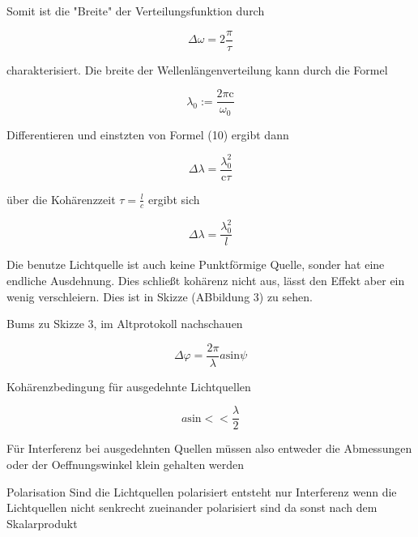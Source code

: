             Somit ist die "Breite" der Verteilungsfunktion durch 

            \begin{equation}
                \Delta \omega = 2 \frac{\pi}{\tau}
            \end{equation}

            charakterisiert. Die breite der Wellenlängenverteilung kann durch die Formel 

            \begin{equation}
                \lambda_0 := \frac{2 \pi \text{c}}{\omega_0}
            \end{equation}

            Differentieren und einstzten von Formel (10) ergibt dann 

            \begin{equation}
                \Delta \lambda = \frac{\lambda_0^2}{\text{c}\tau}
            \end{equation}

            über die Kohärenzzeit $\tau = \frac{l}{c}$ ergibt sich 

            \begin{equation}
                \Delta \lambda = \frac{\lambda_0^2}{l}
            \end{equation}

            Die benutze Lichtquelle ist auch keine Punktförmige Quelle, sonder hat eine endliche Ausdehnung. Dies schließt kohärenz nicht aus, 
            lässt den Effekt aber ein wenig verschleiern. Dies ist in Skizze (ABbildung 3) zu sehen.

        Bums zu Skizze 3, im Altprotokoll nachschauen 

            \begin{equation}
                \Delta \varphi = \frac{2 \pi}{\lambda} a \text{sin} \psi 
            \end{equation}

            Kohärenzbedingung für ausgedehnte Lichtquellen

            \begin{equation}
                a \text{sin} << \frac{\lambda}{2}
            \end{equation}

            Für Interferenz bei ausgedehnten Quellen müssen also entweder die Abmessungen oder der Oeffnungswinkel klein gehalten werden 

            Polarisation
            Sind die Lichtquellen polarisiert entsteht nur Interferenz wenn die Lichtquellen nicht senkrecht zueinander polarisiert 
            sind da sonst nach dem Skalarprodukt 

